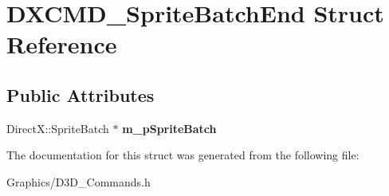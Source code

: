 \hypertarget{structDXCMD__SpriteBatchEnd}{}\section{D\+X\+C\+M\+D\+\_\+\+Sprite\+Batch\+End Struct Reference}
\label{structDXCMD__SpriteBatchEnd}
\subsection*{Public Attributes}
\begin{DoxyCompactItemize}
\item 
\mbox{\label{structDXCMD__SpriteBatchEnd_ae8dd213c5703418d406710da839247ef}} 
Direct\+X\+::\+Sprite\+Batch $\ast$ {\bfseries m\+\_\+p\+Sprite\+Batch}
\end{DoxyCompactItemize}


The documentation for this struct was generated from the following file\+:\begin{DoxyCompactItemize}
\item 
Graphics/D3\+D\+\_\+\+Commands.\+h\end{DoxyCompactItemize}
